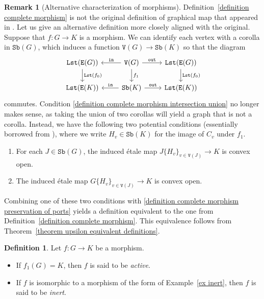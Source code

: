 \documentclass{amsart}
\numberwithin{theorem}{subsection}
\theoremstyle{definition}
\newtheorem{definition}[theorem]{Definition}
\newtheorem{remark}[theorem]{Remark}
\newcommand{\lists}{\mathtt{Lst}}
\newcommand{\sub}{\mathtt{Sb}}
\newcommand{\out}{\mathtt{out}}
\newcommand{\inp}{\mathtt{in}}
\newcommand{\edge}{\mathtt{E}}
\newcommand{\vertex}{\mathtt{V}}
\begin{document}
\begin{remark}[Alternative characterization of morphisms]\label{remark alternative characterization of morphisms}
Definition~\ref{definition complete morphism} is not the original definition of graphical map that appeared in \cite{hrybook}.
Let us give an alternative definition more closely aligned with the original.
Suppose that $f\colon G \to K$ is a morphism. 
We can identify each vertex with a corolla in $\sub(G)$, which induces a function $\vertex(G) \to \sub(K)$ so that the diagram
\[
\begin{tikzcd}
\lists (\edge(G))  \dar["\lists(f_0)"] &\vertex(G)  \dar["f_1"] \lar["\inp" swap] \rar["\out"]& \lists (\edge(G))  \dar["\lists(f_0)"] \\
\lists (\edge(K))  & \sub(K) \lar["\inp" swap] \rar["\out"] & \lists (\edge(K))
\end{tikzcd}
\]
commutes.
Condition \eqref{definition complete morphism intersection union} no longer makes sense, as taking the union of two corollas will yield a graph that is not a corolla.
Instead, we have the following two potential conditions (essentially borrowed from \cite{hrybook}), where we write $H_v \in \sub(K)$ for the image of $C_v$ under $f_1$.
\begin{enumerate}[start=3]
	\item For each $J\in \sub(G)$, the induced \'etale map $J\{ H_v \}_{v\in \vertex(J)} \to K$ is convex open. \label{alternate def subgraphs}
	\item The induced \'etale map $G\{H_v\}_{v\in \vertex(J)} \to K$ is convex open. \label{alternate def whole graph}
\end{enumerate}
Combining one of these two conditions with \eqref{definition complete morphism preservation of ports} yields a definition equivalent to the one from Definition~\ref{definition complete morphism}.
This equivalence follows from Theorem~\ref{theorem upsilon equivalent definitions}.
\end{remark}

\begin{definition}\label{def intact Y}
Let $f\colon G \to K$ be a morphism.
\begin{itemize}
	\item If $f_1(G) = K$, then $f$ is said to be \emph{active}.
	\item If $f$ is isomorphic to a morphism of the form of Example~\ref{ex inert}, then $f$ is said to be \emph{inert}.
\end{itemize}
\end{definition}
\end{document}
